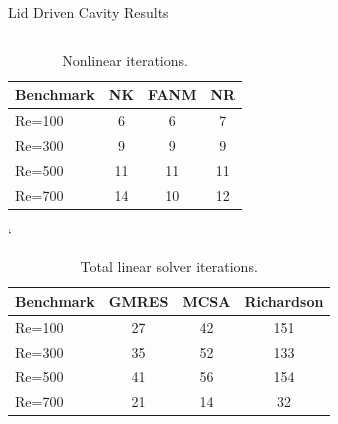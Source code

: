 \documentclass{beamer}
\begin{document}
\begin{frame}{Lid Driven Cavity Results}

  \begin{columns}
    \begin{column}{0.6\textwidth}

      \small{
        \begin{table}[h!]
          \begin{center}
            \begin{tabular}{lccc}\hline\hline
              \multicolumn{1}{l}{Benchmark}& 
              \multicolumn{1}{c}{NK}&
              \multicolumn{1}{c}{FANM}&
              \multicolumn{1}{c}{NR}\\
              \hline
              Re=100 & 6 & 6 & 7\\
              Re=300 & 9 & 9 & 9\\
              Re=500 & 11 & 11 & 11\\
              Re=700 & 14 & 10 & 12\\
              \hline\hline
            \end{tabular}`
          \end{center}
          \caption{Nonlinear iterations.}
        \end{table}

        \begin{table}[h!]
          \begin{center}
            \begin{tabular}{lccc}\hline\hline
              \multicolumn{1}{l}{Benchmark}& 
              \multicolumn{1}{c}{GMRES}&
              \multicolumn{1}{c}{MCSA}&
              \multicolumn{1}{c}{Richardson}\\
              \hline
              Re=100 & 27 & 42 & 151\\
              Re=300 & 35 & 52 & 133\\
              Re=500 & 41 & 56 & 154\\
              Re=700 & 21 & 14 & 32\\
              \hline\hline
            \end{tabular}
          \end{center}
          \caption{Total linear solver iterations.}
        \end{table}
      }

    \end{column}


\end{columns}
\end{frame}
\end{document}
